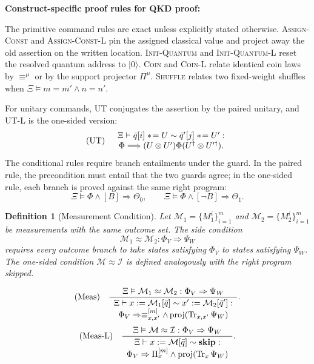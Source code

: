 \documentclass[conference,compsoc]{IEEEtran}
\newcommand{\asteq}{\mathrel{*\!=}}
\newcommand{\Tr}{\operatorname{Tr}}
\newtheorem{definition}{Definition}
\begin{document}
\textbf{Construct-specific proof rules for QKD proof:}

The primitive command rules are exact unless explicitly stated otherwise. \textsc{Assign-Const} and \textsc{Assign-Const-L} pin the assigned classical value and project away the old assertion on the written location. \textsc{Init-Quantum} and \textsc{Init-Quantum-L} reset the resolved quantum address to \(|0\rangle\). \textsc{Coin} and \textsc{Coin-L} relate identical coin laws by \(\equiv^\mu\) or by the support projector \(\Pi^\mu\). \textsc{Shuffle} relates two fixed-weight shuffles when \(\Xi\vDash m=m'\land n=n'\).

For unitary commands, \textsc{UT} conjugates the assertion by the paired unitary, and \textsc{UT-L} is the one-sided version:
\[
\text{\rm (UT)}\quad
\begin{array}{c}
\Xi\vdash
\bar q[i]\asteq U\sim\bar q'[j]\asteq U':\\
\Phi\Longrightarrow
(U\otimes U')\Phi(U^\dagger\otimes U'^\dagger).
\end{array}
\]
The conditional rules require branch entailments under the guard. In the paired rule, the precondition must entail that the two guards agree; in the one-sided rule, each branch is proved against the same right program:
\[
\Xi\vDash
\Phi\land[B]\Rightarrow\Theta_0,
\qquad
\Xi\vDash
\Phi\land[\neg B]\Rightarrow\Theta_1 .
\]

\begin{definition}[Measurement Condition]
Let \(\mathcal{M}_1=\{M_1^{i}\}_{i=1}^m\) and
\(\mathcal{M}_2=\{M_2^i\}_{i=1}^m\) be measurements with the same outcome set. The side condition
\[
\mathcal{M}_1 \approx \mathcal{M}_2: \Phi_V \Longrightarrow \Psi_W
\]
requires every outcome branch to take states satisfying \(\Phi_V\) to states satisfying \(\Psi_W\). The one-sided condition \(\mathcal{M}\approx\mathcal I\) is defined analogously with the right program skipped.
\end{definition}

\[
\text{\rm (Meas)}\quad
\frac{\Xi\vDash
\mathcal M_1\approx\mathcal M_2:\Phi_V\Rightarrow\Psi_W}
{\begin{array}{c}
\Xi\vdash
x:=\mathcal M_1[\bar q]\sim
x':=\mathcal M_2[\bar q']:\\
\Phi_V\Rightarrow
\equiv^{[m]}_{x,x'}\land
\operatorname{proj}(\Tr_{x,x'}\Psi_W)
\end{array}} .
\]
\[
\text{\rm (Meas-L)}\quad
\frac{\Xi\vDash
\mathcal M\approx\mathcal I:\Phi_V\Rightarrow\Psi_W}
{\begin{array}{c}
\Xi\vdash
x:=\mathcal M[\bar q]\sim\mathbf{skip}:\\
\Phi_V\Rightarrow
\Pi^{[m]}_x\land\operatorname{proj}(\Tr_x\Psi_W)
\end{array}} .
\]
\end{document}
